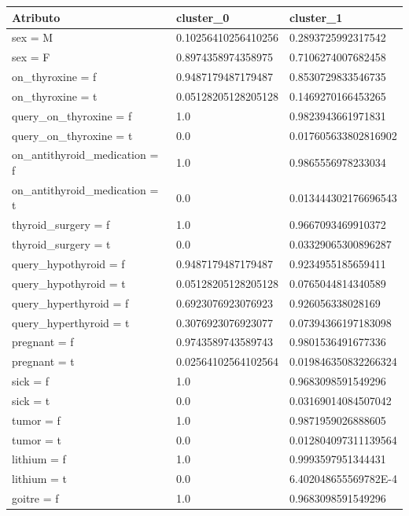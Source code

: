 \documentclass[osajnl,twocolumn,showpacs,superscriptaddress,10pt,floatfix]{revtex4-1} %
\begin{document}
\begin{table}[ht]
    \begin{tabular}{|l|l|l|}
        \hline
        Atributo & cluster\_0 & cluster\_1 \\
        \hline
        
        sex = M & 0.10256410256410256 & 0.2893725992317542 \\
        sex = F & 0.8974358974358975 & 0.7106274007682458 \\
        on\_thyroxine = f & 0.9487179487179487 & 0.8530729833546735 \\
        on\_thyroxine = t & 0.05128205128205128 & 0.1469270166453265 \\
        query\_on\_thyroxine = f & 1.0 & 0.9823943661971831 \\
        query\_on\_thyroxine = t & 0.0 & 0.017605633802816902 \\
        on\_antithyroid\_medication = f & 1.0 & 0.9865556978233034 \\
        on\_antithyroid\_medication = t & 0.0 & 0.013444302176696543 \\
        thyroid\_surgery = f & 1.0 & 0.9667093469910372 \\
        thyroid\_surgery = t & 0.0 & 0.03329065300896287 \\
        query\_hypothyroid = f & 0.9487179487179487 & 0.9234955185659411 \\
        query\_hypothyroid = t & 0.05128205128205128 & 0.0765044814340589 \\
        query\_hyperthyroid = f & 0.6923076923076923 & 0.926056338028169 \\
        query\_hyperthyroid = t & 0.3076923076923077 & 0.07394366197183098 \\
        pregnant = f & 0.9743589743589743 & 0.9801536491677336 \\
        pregnant = t & 0.02564102564102564 & 0.019846350832266324 \\
        sick = f & 1.0 & 0.9683098591549296 \\
        sick = t & 0.0 & 0.03169014084507042 \\
        tumor = f & 1.0 & 0.9871959026888605 \\
        tumor = t & 0.0 & 0.012804097311139564 \\
        lithium = f & 1.0 & 0.9993597951344431 \\
        lithium = t & 0.0 & 6.402048655569782E-4 \\
        goitre = f & 1.0 & 0.9683098591549296 \\

\end{tabular}
\end{table}
\end{document}
